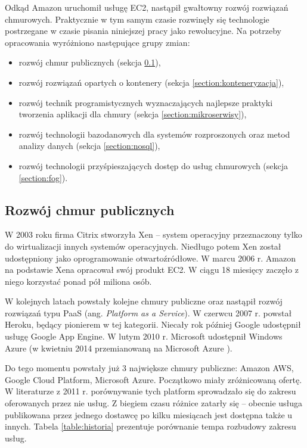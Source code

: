 \documentclass[12pt,a4paper,twoside,titlepage,openright]{book}
\begin{document}
Odkąd Amazon uruchomił usługę EC2, nastąpił gwałtowny rozwój rozwiązań chmurowych. Praktycznie w tym samym czasie rozwinęły się technologie postrzegane w czasie pisania niniejszej pracy jako rewolucyjne. Na potrzeby opracowania wyróżniono następujące grupy zmian:
\begin{itemize}
\item rozwój chmur publicznych (sekcja \ref{section:chmuryPubliczne}),
\item rozwój rozwiązań opartych o kontenery (sekcja \ref{section:konteneryzacja}),
\item rozwój technik programistycznych wyznaczających najlepsze praktyki tworzenia aplikacji dla chmury (sekcja \ref{section:mikroserwisy}),
\item rozwój technologii bazodanowych dla systemów rozproszonych oraz metod analizy danych (sekcja \ref{section:nosql}),
\item rozwój technologii przyśpieszających dostęp do usług chmurowych (sekcja \ref{section:fog}).
\end{itemize}

\subsection{Rozwój chmur publicznych} \label{section:chmuryPubliczne}

W 2003 roku firma Citrix stworzyła Xen -- system operacyjny przeznaczony tylko do wirtualizacji innych systemów operacyjnych. Niedługo potem Xen został udostępniony jako oprogramowanie otwartoźródłowe. W marcu 2006 r. Amazon na podstawie Xena opracował swój produkt EC2. W ciągu 18 miesięcy zaczęło z niego korzystać ponad pół miliona osób.\cite{ccBiznes}

W kolejnych latach powstały kolejne chmury publiczne oraz nastąpił rozwój rozwiązań typu PaaS (ang. \textit{Platform as a Service}). W czerwcu 2007 r. powstał Heroku, będący pionierem w tej kategorii. Niecały rok później Google udostępnił usługę Google App Engine. W lutym 2010 r. Microsoft udostępnił Windows Azure (w kwietniu 2014 przemianowaną na Microsoft Azure \cite{azurePackt}).

Do tego momentu powstały już 3 największe chmury publiczne: Amazon AWS, Google Cloud Platform, Microsoft Azure. Początkowo miały zróżnicowaną ofertę. W literaturze\cite{ccBiznes} z 2011 r. porównywanie tych platform sprowadzało się do zakresu oferowanych przez nie usług. Z biegiem czasu różnice zatarły się -- obecnie usługa publikowana przez jednego dostawcę po kilku miesiącach jest dostępna także u innych. Tabela \ref{table:historia} prezentuje porównanie tempa rozbudowy zakresu usług.
\end{document}
